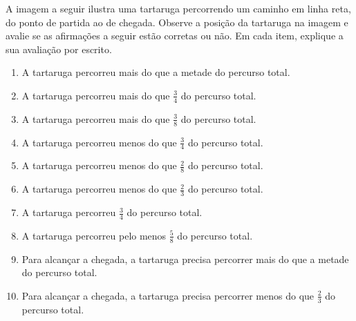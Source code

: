 \begin{atividade}{}\label{chap3-ativ9}

A imagem a seguir ilustra uma tartaruga percorrendo um caminho em linha reta, do ponto de partida ao de chegada. Observe a posição da tartaruga na imagem e avalie se as afirmações a seguir estão corretas ou não. Em cada item, explique a sua avaliação por escrito.

  \begin{figure}[H]
  \centering
  
  \resizebox{\linewidth}{!}
  {
  }
  \end{figure}

\begin{enumerate} %
  \item     A tartaruga percorreu mais do que a metade do percurso total.
  \item     A tartaruga percorreu mais do que     $\frac{3}{4}$     do percurso total.
  \item     A tartaruga percorreu mais do que     $\frac{3}{8}$     do percurso total.
  \item     A tartaruga percorreu menos do que     $\frac{3}{4}$     do percurso total.
  \item     A tartaruga percorreu menos do que     $\frac{2}{8}$     do percurso total.
  \item     A tartaruga percorreu menos do que     $\frac{2}{3}$     do percurso total.
  \item     A tartaruga percorreu     $\frac{3}{4}$     do percurso total.
  \item     A tartaruga percorreu pelo menos     $\frac{5}{8}$     do percurso total.
  \item     Para alcançar a chegada, a tartaruga precisa percorrer mais do que a metade do percurso total.
  \item     Para alcançar a chegada, a tartaruga precisa percorrer menos do que     $\frac{2}{3}$     do percurso total.
\end{enumerate} %

\end{atividade}

